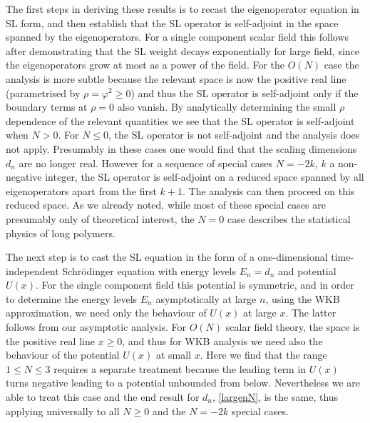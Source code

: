 \documentclass[11pt,a4paper]{article}
\numberwithin{figure}{section}
\numberwithin{equation}{section}
\newcommand{\ph}{\varphi}
\begin{document}
The first steps in deriving these results is to recast the eigenoperator equation in SL form, and then establish that the SL operator is self-adjoint in the space spanned by the eigenoperators. For a single component scalar field this follows after demonstrating that the SL weight decays exponentially for large field, since the eigenoperators grow at most as a power of the field. For the $O(N)$ case the analysis is more subtle because the relevant space is now the positive real line (parametrised by $\rho=\ph^2\ge0$) and thus the SL operator is self-adjoint only if the boundary terms at $\rho=0$ also vanish. By analytically determining the small $\rho$ dependence of the relevant quantities we see that the SL operator is self-adjoint when $N>0$. For $N\le0$, the SL operator is not self-adjoint and the analysis does not apply. Presumably in these cases one would find that the scaling dimensions $d_n$ are no longer real. However for a sequence of special cases $N=-2k$, $k$ a non-negative integer, the SL operator is self-adjoint on a reduced space spanned by all eigenoperators apart from the first $k+1$. The analysis can then proceed on this reduced space. As we already noted, while most of these special cases are presumably only of theoretical interest, the $N=0$ case describes the statistical physics of long polymers.

The next step is to cast the SL equation in the form of a one-dimensional time-independent Schr\"odinger equation with energy levels $E_n=d_n$ and potential $U(x)$. For the single component field this potential is symmetric, and in order to determine the energy levels $E_n$ asymptotically at large $n$, using the WKB approximation, we need only the behaviour of $U(x)$ at large $x$. The latter follows  from our asymptotic analysis. For $O(N)$ scalar field theory, the space is the positive real line $x\ge0$, and thus for WKB analysis we need also the behaviour of the potential $U(x)$ at small $x$. Here we find that the range $1\le  N\le 3$ requires a separate treatment because the leading term in $U(x)$ turns negative leading to a potential unbounded from below. Nevertheless we are able to treat this case and the end result for $d_n$, \eqref{largenN}, is the same, thus applying universally to all $N\ge0$ and the $N=-2k$ special cases.
\end{document}
